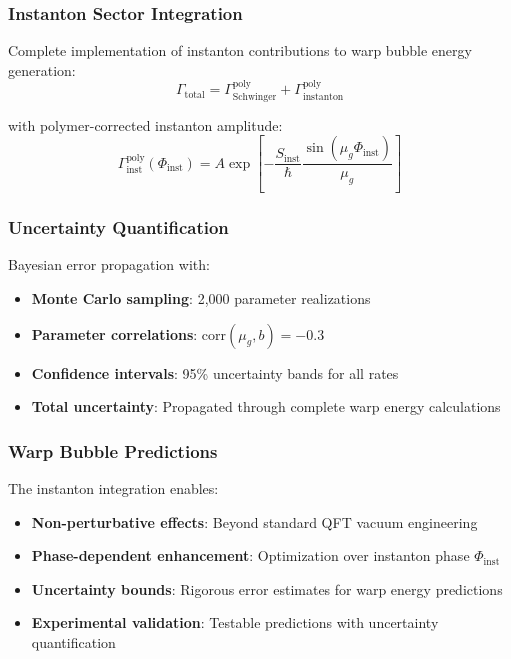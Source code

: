 \documentclass[11pt]{article}
\begin{document}
\subsubsection{Instanton Sector Integration}
Complete implementation of instanton contributions to warp bubble energy generation:
\begin{equation}
\Gamma_{\text{total}} = \Gamma_{\text{Schwinger}}^{\text{poly}} + \Gamma_{\text{instanton}}^{\text{poly}}
\end{equation}

with polymer-corrected instanton amplitude:
\begin{equation}
\Gamma_{\text{inst}}^{\text{poly}}(\Phi_{\text{inst}}) = A \exp\left[-\frac{S_{\text{inst}}}{\hbar} \frac{\sin(\mu_g \Phi_{\text{inst}})}{\mu_g}\right]
\end{equation}

\subsubsection{Uncertainty Quantification}
Bayesian error propagation with:
\begin{itemize}
    \item \textbf{Monte Carlo sampling}: 2,000 parameter realizations
    \item \textbf{Parameter correlations}: $\text{corr}(\mu_g, b) = -0.3$
    \item \textbf{Confidence intervals}: 95\% uncertainty bands for all rates
    \item \textbf{Total uncertainty}: Propagated through complete warp energy calculations
\end{itemize}

\subsubsection{Warp Bubble Predictions}
The instanton integration enables:
\begin{itemize}
    \item \textbf{Non-perturbative effects}: Beyond standard QFT vacuum engineering
    \item \textbf{Phase-dependent enhancement}: Optimization over instanton phase $\Phi_{\text{inst}}$
    \item \textbf{Uncertainty bounds}: Rigorous error estimates for warp energy predictions
    \item \textbf{Experimental validation}: Testable predictions with uncertainty quantification
\end{itemize}
\end{document}
